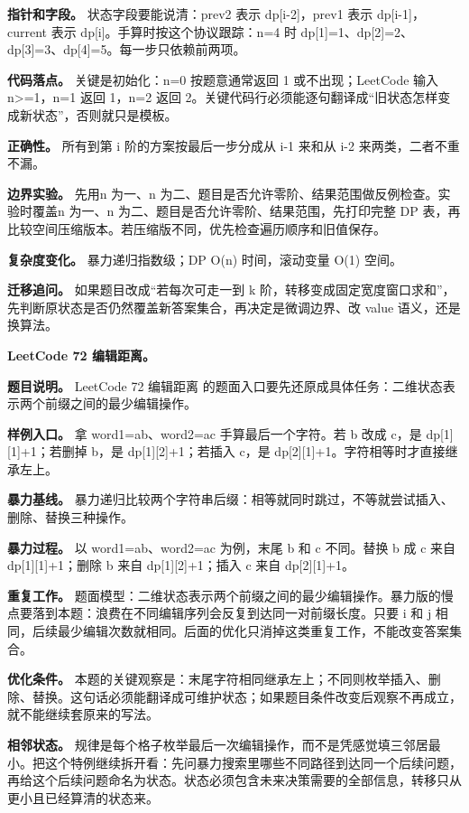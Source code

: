 \textbf{指针和字段。} 状态字段要能说清：prev2 表示 dp[i-2]，prev1 表示 dp[i-1]，current 表示 dp[i]。手算时按这个协议跟踪：n=4 时 dp[1]=1、dp[2]=2、dp[3]=3、dp[4]=5。每一步只依赖前两项。

\textbf{代码落点。} 关键是初始化：n=0 按题意通常返回 1 或不出现；LeetCode 输入 n>=1，n=1 返回 1，n=2 返回 2。关键代码行必须能逐句翻译成“旧状态怎样变成新状态”，否则就只是模板。

\textbf{正确性。} 所有到第 i 阶的方案按最后一步分成从 i-1 来和从 i-2 来两类，二者不重不漏。

\textbf{边界实验。} 先用n 为一、n 为二、题目是否允许零阶、结果范围做反例检查。实验时覆盖n 为一、n 为二、题目是否允许零阶、结果范围，先打印完整 DP 表，再比较空间压缩版本。若压缩版不同，优先检查遍历顺序和旧值保存。

\textbf{复杂度变化。} 暴力递归指数级；DP O(n) 时间，滚动变量 O(1) 空间。

\textbf{迁移追问。} 如果题目改成“若每次可走一到 k 阶，转移变成固定宽度窗口求和”，先判断原状态是否仍然覆盖新答案集合，再决定是微调边界、改 value 语义，还是换算法。

\noindent\textbf{LeetCode 72 编辑距离。}

\textbf{题目说明。} LeetCode 72 编辑距离 的题面入口要先还原成具体任务：二维状态表示两个前缀之间的最少编辑操作。

\textbf{样例入口。} 拿 word1=ab、word2=ac 手算最后一个字符。若 b 改成 c，是 dp[1][1]+1；若删掉 b，是 dp[1][2]+1；若插入 c，是 dp[2][1]+1。字符相等时才直接继承左上。

\textbf{暴力基线。} 暴力递归比较两个字符串后缀：相等就同时跳过，不等就尝试插入、删除、替换三种操作。

\textbf{暴力过程。} 以 word1=ab、word2=ac 为例，末尾 b 和 c 不同。替换 b 成 c 来自 dp[1][1]+1；删除 b 来自 dp[1][2]+1；插入 c 来自 dp[2][1]+1。

\textbf{重复工作。} 题面模型：二维状态表示两个前缀之间的最少编辑操作。暴力版的慢点要落到本题：浪费在不同编辑序列会反复到达同一对前缀长度。只要 i 和 j 相同，后续最少编辑次数就相同。后面的优化只消掉这类重复工作，不能改变答案集合。

\textbf{优化条件。} 本题的关键观察是：末尾字符相同继承左上；不同则枚举插入、删除、替换。这句话必须能翻译成可维护状态；如果题目条件改变后观察不再成立，就不能继续套原来的写法。

\textbf{相邻状态。} 规律是每个格子枚举最后一次编辑操作，而不是凭感觉填三邻居最小。把这个特例继续拆开看：先问暴力搜索里哪些不同路径到达同一个后续问题，再给这个后续问题命名为状态。状态必须包含未来决策需要的全部信息，转移只从更小且已经算清的状态来。

